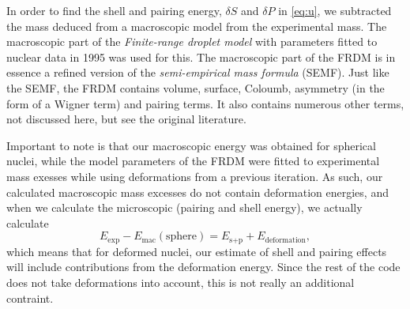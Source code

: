 In order to find the shell and pairing energy, $\delta S$ and $\delta P$ in \eqref{eq:u}, we subtracted the mass deduced from a macroscopic model from the experimental mass.
The macroscopic part of the \emph{Finite-range droplet model} with parameters fitted to nuclear data in 1995\cite{moller1995} was used for this. The macroscopic part of the FRDM is in essence a refined version of the \emph{semi-empirical mass formula} (SEMF). Just like the SEMF, the FRDM contains volume, surface, Coloumb, asymmetry (in the form of a Wigner term) and pairing terms. It also contains numerous other terms, not discussed here, but see the original literature\cite{moller1995}.

Important to note is that our macroscopic energy was obtained for spherical nuclei, while the model parameters of the FRDM were fitted to experimental mass exesses while using deformations from a previous iteration. As such, our calculated macroscopic mass excesses do not contain deformation energies, and when we calculate the microscopic (pairing and shell energy), we actually calculate
\begin{equation}
E_\text{exp} - E_\text{mac}(\text{sphere}) = E_{\text{s}+\text{p}} + E_\text{deformation},
\end{equation}
which means that for deformed nuclei, our estimate of shell and pairing effects will include contributions from the deformation energy.
Since the rest of the code does not take deformations into account, this is not really an additional contraint.%

